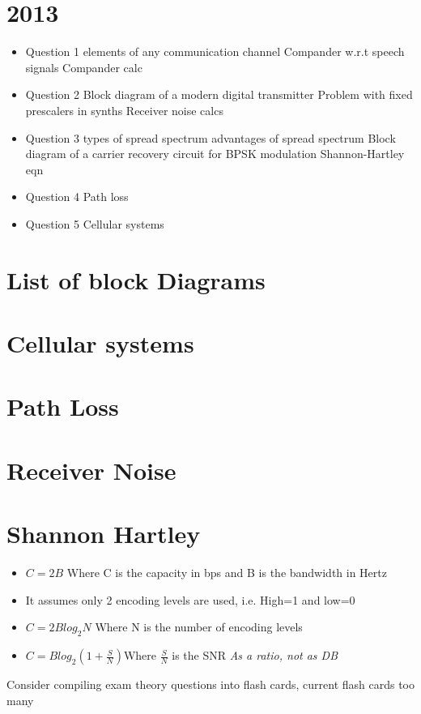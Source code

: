\documentclass{article}
\begin{document}
\begin{multicols}{2}
\begin{itemize}
\end{itemize}
\section{2013}
\begin{itemize}
	\item Question 1
		 elements of any communication channel
		\subitem Compander w.r.t speech signals
		\subitem Compander calc
	\item Question 2
		\subitem Block diagram of a modern digital transmitter
		\subitem Problem with fixed prescalers in synths
		\subitem Receiver noise calcs
	\item Question 3
		 types of spread spectrum
		 advantages of spread spectrum
		\subitem Block diagram of a carrier recovery circuit for BPSK modulation
		\subitem Shannon-Hartley eqn
	\item Question 4
		\subitem Path loss
	\item Question 5
		\subitem Cellular systems
	
\end{itemize}
\section{List of block Diagrams}

\section{Cellular systems}

\section{Path Loss}

\section{Receiver Noise}

\section{Shannon Hartley}
\begin{itemize}
	\item $C=2B$ Where C is the capacity in bps and B is the bandwidth in Hertz
	\item It assumes only 2 encoding levels are used, i.e. High=1 and low=0
	\item $C=2Blog_2N$ Where N is the number of encoding levels
	\item $C=Blog_2\left(1+\frac{S}{N}\right)$Where $\frac{S}{N} $ is the SNR \emph{As a ratio, not as DB}
\end{itemize}
\end{multicols}
Consider compiling exam theory questions into flash cards, current flash cards too many
\end{document}
